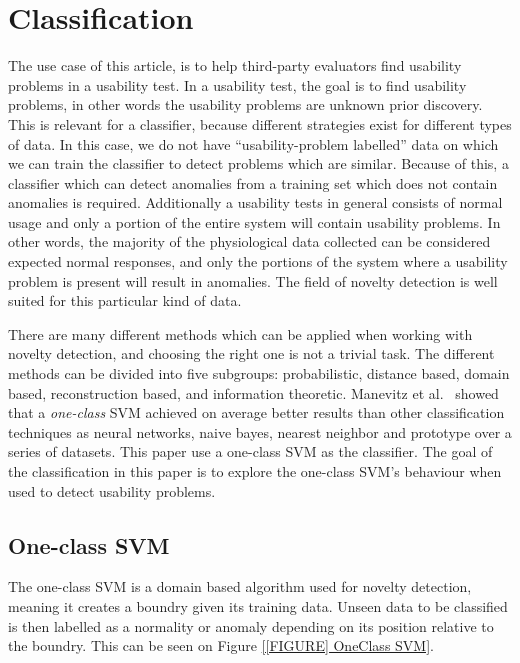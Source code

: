 \section{Classification}
The use case of this article, is to help third-party evaluators find usability problems in a usability test.
In a usability test, the goal is to find usability problems, in other words the usability problems are unknown prior discovery. This is relevant for a classifier, because different strategies exist for different types of data. In this case, we do not have ``usability-problem labelled'' data on which we can train the classifier to detect problems which are similar. Because of this, a classifier which can detect anomalies from a training set which does not contain anomalies is required.
Additionally a usability tests in general consists of normal usage and only a portion of the entire system will contain usability problems. In other words, the majority of the physiological data collected can be considered expected normal responses, and only the portions of the system where a usability problem is present will result in anomalies.
The field of novelty detection\cite{noveltyDetection} is well suited for this particular kind of data.

There are many different methods which can be applied when working with novelty detection\cite{noveltyDetection}, and choosing the right one is not a trivial task.
The different methods can be divided into five subgroups: probabilistic, distance based, domain based, reconstruction based, and information theoretic.
Manevitz et al.~\cite{oneClassSVM} showed that a \textit{one-class} SVM achieved on average better results than other classification techniques as neural networks, naive bayes, nearest neighbor and prototype over a series of datasets.
This paper use a one-class SVM as the classifier.
The goal of the classification in this paper is to explore the one-class SVM's behaviour when used to detect usability problems.

\subsection{One-class SVM}
The one-class SVM is a domain based algorithm used for novelty detection, meaning it creates a boundry given its training data.
Unseen data to be classified is then labelled as a normality or anomaly depending on its position relative to the boundry.
This can be seen on Figure \ref{[FIGURE] OneClass SVM}.

